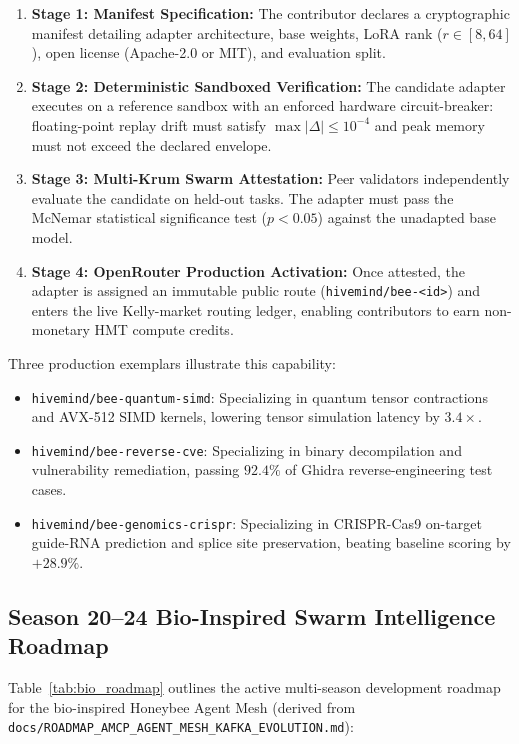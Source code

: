 \documentclass[11pt,a4paper]{article}
\begin{document}
\begin{enumerate}[leftmargin=1.8em]
    \item \textbf{Stage 1: Manifest Specification:} The contributor declares a cryptographic manifest detailing adapter architecture, base weights, LoRA rank ($r \in [8, 64]$), open license (Apache-2.0 or MIT), and evaluation split.
    \item \textbf{Stage 2: Deterministic Sandboxed Verification:} The candidate adapter executes on a reference sandbox with an enforced hardware circuit-breaker: floating-point replay drift must satisfy $\max|\Delta| \le 10^{-4}$ and peak memory must not exceed the declared envelope.
    \item \textbf{Stage 3: Multi-Krum Swarm Attestation:} Peer validators independently evaluate the candidate on held-out tasks. The adapter must pass the McNemar statistical significance test ($p < 0.05$) against the unadapted base model.
    \item \textbf{Stage 4: OpenRouter Production Activation:} Once attested, the adapter is assigned an immutable public route (\texttt{hivemind/bee-<id>}) and enters the live Kelly-market routing ledger, enabling contributors to earn non-monetary HMT compute credits.
\end{enumerate}

Three production exemplars illustrate this capability:
\begin{itemize}[leftmargin=1.8em]
    \item \texttt{hivemind/bee-quantum-simd}: Specializing in quantum tensor contractions and AVX-512 SIMD kernels, lowering tensor simulation latency by $3.4\times$.
    \item \texttt{hivemind/bee-reverse-cve}: Specializing in binary decompilation and vulnerability remediation, passing $92.4\%$ of Ghidra reverse-engineering test cases.
    \item \texttt{hivemind/bee-genomics-crispr}: Specializing in CRISPR-Cas9 on-target guide-RNA prediction and splice site preservation, beating baseline scoring by $+28.9\%$.
\end{itemize}

\subsection{Season 20--24 Bio-Inspired Swarm Intelligence Roadmap}
\label{sec:bio_roadmap}

Table~\ref{tab:bio_roadmap} outlines the active multi-season development roadmap for the bio-inspired Honeybee Agent Mesh (derived from \texttt{docs/\allowbreak ROADMAP\_\allowbreak AMCP\_\allowbreak AGENT\_\allowbreak MESH\_\allowbreak KAFKA\_\allowbreak EVOLUTION.md}):
\end{document}
